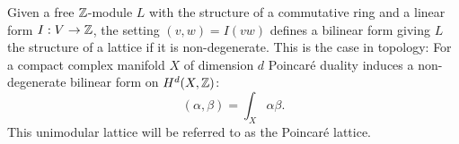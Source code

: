 \begin{example}
Given a free $\mathbb{Z}$-module $L$ with the structure of a commutative ring and a linear form $I:V\rightarrow \mathbb{Z}$, the setting $\left(v,w\right)=I(vw)$ defines a bilinear form giving $L$ the structure of a lattice if it is non-degenerate. This is the case in topology:
For a compact complex manifold $X$ of dimension $d$ Poincar\'e duality induces a non-degenerate bilinear form on $H^d(X,\mathbb{Z})$: $$\left(\alpha,\beta\right) = \int_X\alpha\beta.$$ 
This unimodular lattice will be referred to as the Poincar\'e lattice.
\end{example}
